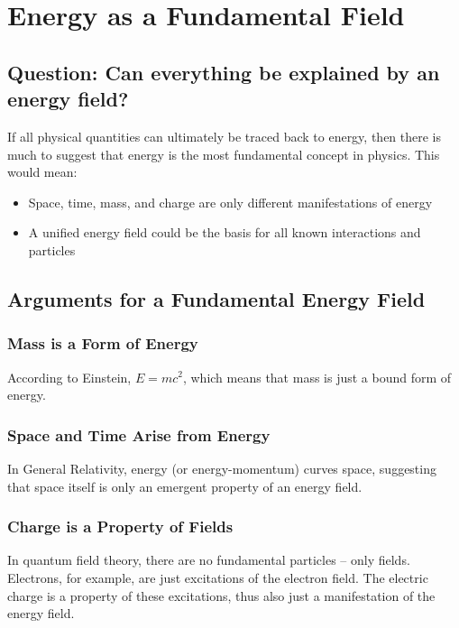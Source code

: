 \documentclass{article}
\begin{document}
\section{Energy as a Fundamental Field}

\subsection{Question: Can everything be explained by an energy field?}

If all physical quantities can ultimately be traced back to energy, then there is much to suggest that energy is the most fundamental concept in physics. This would mean:

\begin{itemize}
	\item Space, time, mass, and charge are only different manifestations of energy
	\item A unified energy field could be the basis for all known interactions and particles
\end{itemize}

\subsection{Arguments for a Fundamental Energy Field}

\subsubsection{Mass is a Form of Energy}
According to Einstein, $E = mc^2$, which means that mass is just a bound form of energy.

\subsubsection{Space and Time Arise from Energy}
In General Relativity, energy (or energy-momentum) curves space, suggesting that space itself is only an emergent property of an energy field.

\subsubsection{Charge is a Property of Fields}
In quantum field theory, there are no fundamental particles – only fields. Electrons, for example, are just excitations of the electron field. The electric charge is a property of these excitations, thus also just a manifestation of the energy field.
\end{document}
